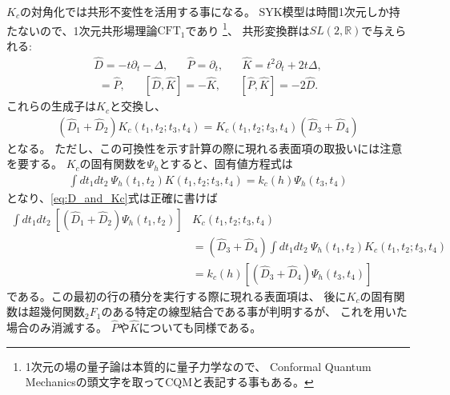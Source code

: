 $K_c$の対角化では共形不変性を活用する事になる。
SYK模型は時間1次元しか持たないので、1次元共形場理論$\mathrm{CFT}_1$であり
\footnote{1次元の場の量子論は本質的に量子力学なので、
Conformal Quantum Mechanicsの頭文字を取ってCQMと表記する事もある。}、
共形変換群は$SL(2, \mathbb{R})$で与えられる\cite{andrzejewski}:
\begin{align}
	\hat{D} = -t\partial_t - \Delta,\hspace{20pt}
	\hat{P} = \partial_t,\hspace{20pt}
	\hat{K} = t^2\partial_t + 2t\Delta,
\end{align}
\begin{align}
	[\hat{D}, \hat{P}] = \hat{P},\hspace{20pt}
	[\hat{D}, \hat{K}] = -\hat{K},\hspace{20pt}
	[\hat{P}, \hat{K}] = -2\hat{D}.
\end{align}
これらの生成子は$K_c$と交換し、
\begin{align}
	(\hat{D}_1 + \hat{D}_2)K_c(t_1, t_2; t_3, t_4)
	= K_c(t_1, t_2; t_3, t_4)(\hat{D}_3 + \hat{D}_4)
	\label{eq:D_and_Kc}
\end{align}
となる。
ただし、この可換性を示す計算の際に現れる表面項の取扱いには注意を要する。
$K_c$の固有関数を$\Psi_h$とすると、固有値方程式は
\begin{align}
	\int dt_1dt_2\ \Psi_h(t_1, t_2) K(t_1, t_2; t_3, t_4)
	= k_c(h)\Psi_h(t_3, t_4)
	\label{eq:eigen_eq_of_Kc}
\end{align}
となり、\eqref{eq:D_and_Kc}式は正確に書けば
\begin{align}
	\int dt_1 dt_2\ \left[(\hat{D}_1 + \hat{D}_2)\Psi_h(t_1, t_2)\right]
	&K_c(t_1, t_2; t_3, t_4)\nonumber\\
	&= (\hat{D}_3 + \hat{D}_4)\int dt_1dt_2\ \Psi_h(t_1, t_2) K_c(t_1, t_2; t_3, t_4)
	\nonumber\\
	&= k_c(h)\left[(\hat{D}_3 + \hat{D}_4)\Psi_h(t_3, t_4)\right]
\end{align}
である。この最初の行の積分を実行する際に現れる表面項は、
後に$K_c$の固有関数は超幾何関数${}_2F_1$のある特定の線型結合である事が判明するが、
これを用いた場合のみ消滅する。
$\hat{P}$や$\hat{K}$についても同様である。

